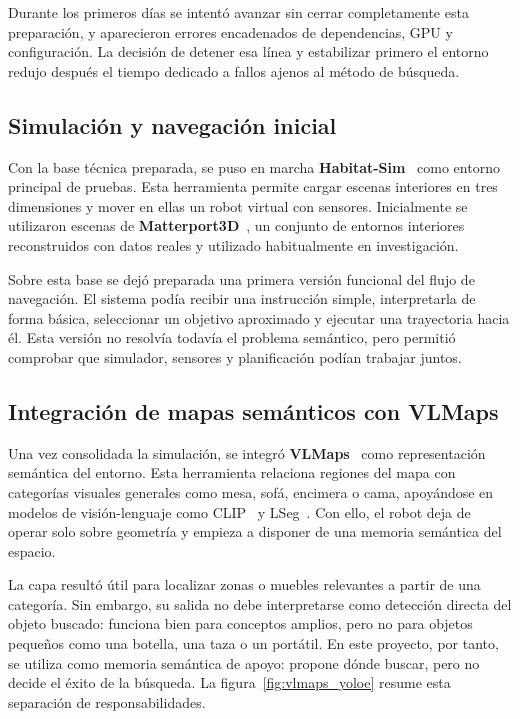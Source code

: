 \documentclass[11pt,fleqn,openany]{book} %
\let\cite=\parencite
\begin{document}
Durante los primeros días se intentó avanzar sin cerrar completamente esta preparación, y aparecieron errores encadenados de dependencias, GPU y configuración. La decisión de detener esa línea y estabilizar primero el entorno redujo después el tiempo dedicado a fallos ajenos al método de búsqueda.

\subsection*{Simulación y navegación inicial}

Con la base técnica preparada, se puso en marcha \textbf{Habitat-Sim}~\cite{savva2019habitat,szot2021habitat2} como entorno principal de pruebas. Esta herramienta permite cargar escenas interiores en tres dimensiones y mover en ellas un robot virtual con sensores. Inicialmente se utilizaron escenas de \textbf{Matterport3D}~\cite{chang2017matterport3d}, un conjunto de entornos interiores reconstruidos con datos reales y utilizado habitualmente en investigación.

Sobre esta base se dejó preparada una primera versión funcional del flujo de navegación. El sistema podía recibir una instrucción simple, interpretarla de forma básica, seleccionar un objetivo aproximado y ejecutar una trayectoria hacia él. Esta versión no resolvía todavía el problema semántico, pero permitió comprobar que simulador, sensores y planificación podían trabajar juntos.

\subsection*{Integración de mapas semánticos con VLMaps}

Una vez consolidada la simulación, se integró \textbf{VLMaps}~\cite{huang2023vlmaps} como representación semántica del entorno. Esta herramienta relaciona regiones del mapa con categorías visuales generales como mesa, sofá, encimera o cama, apoyándose en modelos de visión-lenguaje como CLIP~\cite{radford2021clip} y LSeg~\cite{li2022lseg}. Con ello, el robot deja de operar solo sobre geometría y empieza a disponer de una memoria semántica del espacio.

La capa resultó útil para localizar zonas o muebles relevantes a partir de una categoría. Sin embargo, su salida no debe interpretarse como detección directa del objeto buscado: funciona bien para conceptos amplios, pero no para objetos pequeños como una botella, una taza o un portátil. En este proyecto, por tanto, se utiliza como memoria semántica de apoyo: propone dónde buscar, pero no decide el éxito de la búsqueda. La figura~\ref{fig:vlmaps_yoloe} resume esta separación de responsabilidades.
\end{document}
